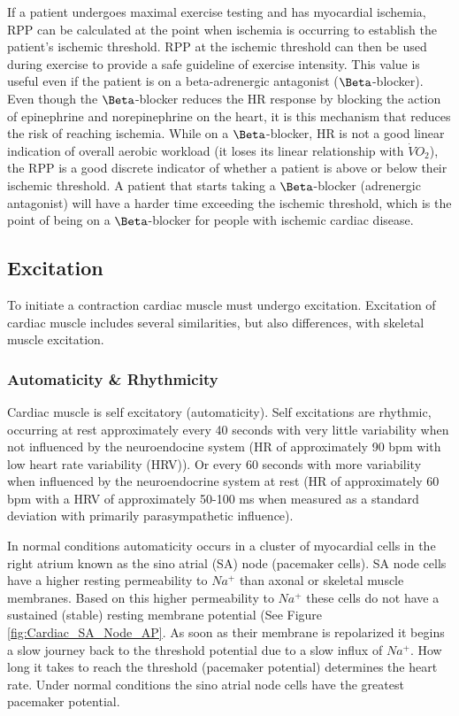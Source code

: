 If a patient undergoes maximal exercise testing and has myocardial ischemia, RPP can be calculated at the point when ischemia is occurring to establish the patient’s ischemic threshold. RPP at the ischemic threshold can then be used during exercise to provide a safe guideline of exercise intensity. This value is useful even if the patient is on a beta-adrenergic antagonist ($\Beta$-blocker). Even though the $\Beta$-blocker reduces the HR response by blocking the action of epinephrine and norepinephrine on the heart, it is this mechanism that reduces the risk of reaching ischemia. While on a $\Beta$-blocker, HR is not a good linear indication of overall aerobic workload (it loses its linear relationship with $\dot{V}O_2$), the RPP is a good discrete indicator of whether a patient is above or below their ischemic threshold. A patient that starts taking a $\Beta$-blocker (adrenergic antagonist) will have a harder time exceeding the ischemic threshold, which is the point of being on a $\Beta$-blocker for people with ischemic cardiac disease. 


\subsection{Excitation}

To initiate a contraction cardiac muscle must undergo excitation. Excitation of cardiac muscle includes several similarities, but also differences, with skeletal muscle excitation. 

\subsubsection{Automaticity \& Rhythmicity}

Cardiac muscle is self excitatory (automaticity). Self excitations are rhythmic, occurring at rest approximately every 40 seconds with very little variability when not influenced by the neuroendocine system (HR of approximately 90 bpm with low heart rate variability (HRV)). Or every 60 seconds with more variability when influenced by the neuroendocrine system at rest (HR of approximately 60 bpm with a HRV of approximately 50-100 ms when measured as a standard deviation with primarily parasympathetic influence).

In normal conditions automaticity occurs in a cluster of myocardial cells in the right atrium known as the sino atrial (SA) node (pacemaker cells). SA node cells have a higher resting permeability to $Na^+$ than axonal or skeletal muscle membranes. Based on this higher permeability to $Na^+$ these cells do not have a sustained (stable) resting membrane potential (See Figure \ref{fig:Cardiac_SA_Node_AP}. As soon as their membrane is repolarized it begins a slow journey back to the threshold potential due to a slow influx of $Na^+$. How long it takes to reach the threshold (pacemaker potential) determines the heart rate. Under normal conditions the sino atrial node cells have the greatest pacemaker potential.

